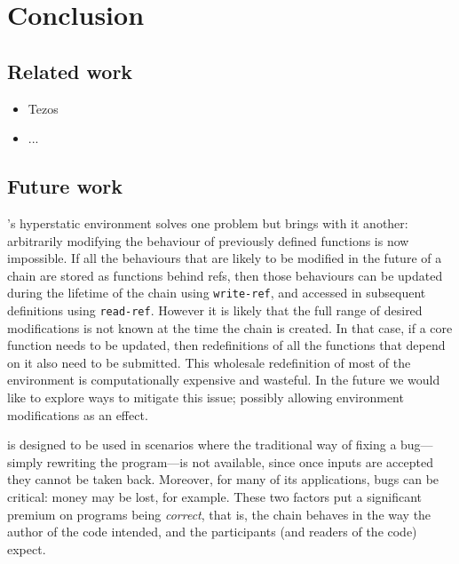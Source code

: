 \section{Conclusion}

\subsection{Related work}

\begin{itemize}
  \item Tezos
  \item ...
\end{itemize}

\subsection{Future work}

\rad's hyperstatic environment solves one problem but brings with it another:
arbitrarily modifying the behaviour of previously defined functions is now
impossible. If all the behaviours that are likely to be modified in the future of
a chain are stored as functions behind refs, then those behaviours can be
updated during the lifetime of the chain using \texttt{write-ref}, and accessed
in subsequent definitions using \texttt{read-ref}. However it is likely that the
full range of desired modifications is not known at the time the chain is
created. In that case, if a core function needs to be updated, then
redefinitions of all the functions that depend on it also need to be submitted.
This wholesale redefinition of most of the environment is computationally
expensive and wasteful. In the future we would like to explore ways to mitigate
this issue; possibly allowing environment modifications as an effect.

\rad{} is designed to be used in scenarios where the traditional way of fixing a bug---simply rewriting the program---is not available, since once inputs are accepted they cannot be taken back. Moreover, for many of its applications, bugs can be critical: money may be lost, for example. These two factors put a significant premium on programs being \emph{correct}, that is, the chain
behaves in the way the author of the code intended, and the participants (and
readers of the code) expect.

